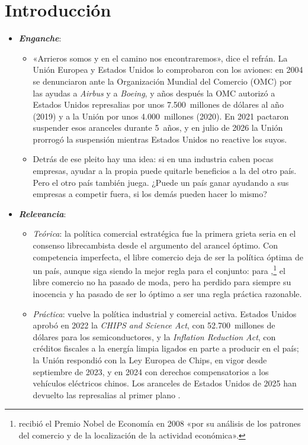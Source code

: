 \documentclass[11pt]{article}
\begin{document}
\tceetitulo

\section*{Introducción}

\begin{itemize}
\item \textbf{\emph{Enganche}}:
  \begin{itemize}
  \item «Arrieros somos y en el camino nos encontraremos», dice el refrán. La Unión Europea y Estados Unidos lo comprobaron con los aviones: en 2004 se denunciaron ante la Organización Mundial del Comercio (OMC) por las ayudas a \emph{Airbus} y a \emph{Boeing}, y años después la OMC autorizó a Estados Unidos represalias por unos 7.500~millones de dólares al año (2019) y a la Unión por unos 4.000~millones (2020)\nocite{OMC2019DS316,OMC2020DS353}. En 2021 pactaron suspender esos aranceles durante 5~años\nocite{USTR2021Aircraft}, y en julio de 2026 la Unión prorrogó la suspensión mientras Estados Unidos no reactive los suyos\nocite{Gafta2026Aircraft}.
  \item Detrás de ese pleito hay una idea: si en una industria caben pocas empresas, ayudar a la propia puede quitarle beneficios a la del otro país. Pero el otro país también juega. ¿Puede un país ganar ayudando a sus empresas a competir fuera, si los demás pueden hacer lo mismo?
  \end{itemize}

\item \textbf{\emph{Relevancia}}:
  \begin{itemize}
  \item \emph{Teórica}: la política comercial estratégica fue la primera grieta seria en el consenso librecambista desde el argumento del arancel óptimo. Con competencia imperfecta, el libre comercio deja de ser la política óptima de un país, aunque siga siendo la mejor regla para el conjunto: para \textcite[132]{Krugman1987Passe},\footnote{ recibió el Premio Nobel de Economía en 2008 «por su análisis de los patrones del comercio y de la localización de la actividad económica»\nocite{Nobel2008Krugman}.} el libre comercio no ha pasado de moda, pero ha perdido para siempre su inocencia y ha pasado de ser lo óptimo a ser una regla práctica razonable.
  \item \emph{Práctica}: vuelve la política industrial y comercial activa. Estados Unidos aprobó en 2022 la \emph{CHIPS and Science Act}, con 52.700~millones de dólares para los semiconductores\nocite{CasaBlanca2022CHIPS}, y la \emph{Inflation Reduction Act}, con créditos fiscales a la energía limpia ligados en parte a producir en el país\nocite{Congreso2022IRA}; la Unión respondió con la Ley Europea de Chips, en vigor desde septiembre de 2023\nocite{CE2026ChipsAct}, y en 2024 con derechos compensatorios a los vehículos eléctricos chinos\nocite{UE2024BEV}. Los aranceles de Estados Unidos de 2025 han devuelto las represalias al primer plano .
  \end{itemize}


\end{itemize}
\end{document}
